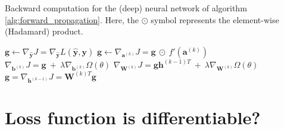 		\begin{algorithm}[H]
			\caption{Backward computation for the (deep) neural network of algorithm
			\ref{alg:forward_propagation}. Here, the $\odot$ symbol represents the element-wise
			(Hadamard) product.}
			\label{alg:backward_propagation}
			\begin{algorithmic}[1]
					\State $\mathbf{g} \leftarrow \nabla_{\hat{\mathbf{y}}}J = \nabla_{\hat{\mathbf{y}}}
					L(\hat{\mathbf{y}}, \mathbf{y})$
						\State $\mathbf{g} \leftarrow \nabla_{\mathbf{a}^{(k)}}J = \mathbf{g} \ \odot \
						f'(\mathbf{a}^{(k)})$
						\State $\nabla_{\mathbf{b}^{(k)}}J = \mathbf{g} \ + \ \lambda \nabla_{\mathbf{b}^{(k)}}
						\Omega(\theta)$
						\State $\nabla_{\mathbf{W}^{(k)}}J = \mathbf{g}\mathbf{h}^{(k - 1)T} \ + \ \lambda
						\nabla_{\mathbf{W}^{(k)}} \Omega(\theta)$
						\State $\mathbf{g} = \nabla_{\mathbf{h}^{(k - 1)}}J = \mathbf{W}^{(k)T}\mathbf{g}$
					\EndFor
				\EndProcedure
			\end{algorithmic}
		\end{algorithm}

	\section{Loss function is differentiable?} %
	\label{sec:loss_function_is_differentiable_}


